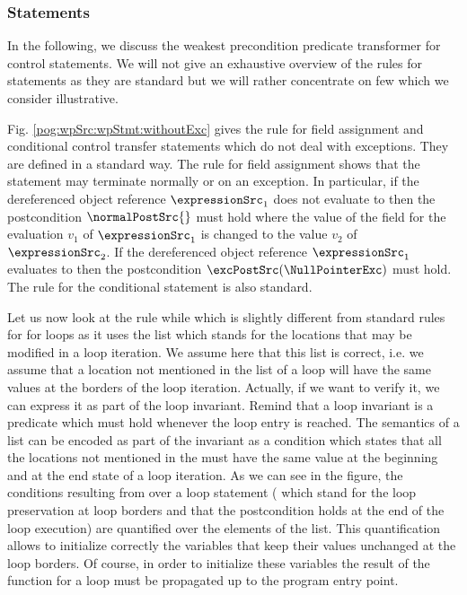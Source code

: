 
\subsubsection{Statements}\label{pog:wpSrc:wpStmt}

In the following, we discuss  the weakest precondition predicate transformer for  control statements.
 We will not give an exhaustive overview of the \wpName{} rules for statements as they are standard 
but we will rather  concentrate on few which we consider illustrative. 

Fig. \ref{pog:wpSrc:wpStmt:withoutExc} gives  the rule for  field assignment and conditional control transfer
statements which do not deal with exceptions. They are defined in a standard way. 
The rule for field assignment shows that the statement may terminate normally or on an exception. 
In particular, if the  dereferenced object reference $\expressionSrc_1$ does not evaluate to \Mynull{} 
 then  the postcondition $\normalPostSrc{}$ must hold where the value of the field \fieldd{} for the 
evaluation $v_1$ of $\expressionSrc_1$ is changed to the value  $v_2$ of  $\expressionSrc_2$.
If  the  dereferenced object reference $\expressionSrc_1$  evaluates to \Mynull{} then the postcondition 
$ \excPostSrc(\NullPointerExc) $ must hold.
The rule for the conditional statement is also standard.

Let us now look  at the rule \textsf{while} which is slightly different from 
standard rules for \wpName{} for loops as it uses the list \modLoop{}  which stands for the locations that may be modified  in a loop iteration. 
We assume here that this list is correct, i.e. we assume that a location not mentioned in the list  \modLoop{} of a loop 
will have the same values at the borders of the loop iteration.
 Actually, if we want to verify   it, we can express it as part of the loop invariant. Remind that a loop invariant  is a predicate which must hold
whenever the loop entry is reached. The semantics of a \modLoop{} list can be encoded as part of the invariant as a condition which states
that all the locations not mentioned in the \modLoop{} must have the same value at the beginning and at the end state of a loop iteration.
As we can see in the figure, the conditions resulting from \wpName{} over a loop statement ( which stand for the loop preservation at loop borders 
and that the postcondition holds at the end of the loop execution) are quantified over the 
elements of the \modLoop{} list. This quantification allows to initialize correctly the variables that keep their values unchanged at the loop borders.
Of course, in order to initialize these variables the result of the \wpName{} function for a loop must be propagated up to the program entry point.


